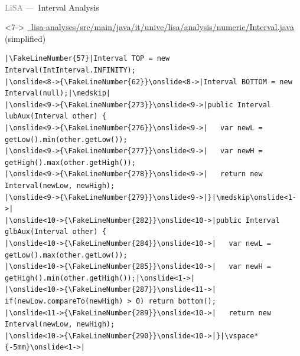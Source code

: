 \begin{frame}[fragile]{\textcolor{gray}{LiSA ---~}Interval Analysis\textsuperscript{\color{gray}\smaller[2]\cite[p.\,389]{cousout2021principles}}}
\begin{uncoverenv}<7->
{\scriptsize\color{gray}\href{https://github.com/lisa-analyzer/lisa/blob/bd00779ab87e1cd31ed01b97d9b0e71b922f5bcf/lisa/lisa-analyses/src/main/java/it/unive/lisa/analysis/numeric/Interval.java}{\hbox{\faFileCodeO~}lisa-analyses/src/main/java/it/unive/lisa/analysis/numeric/Interval.java} (simplified)}
\begin{verbatim}
|\FakeLineNumber{57}|Interval TOP = new Interval(IntInterval.INFINITY);
|\onslide<8->{\FakeLineNumber{62}}\onslide<8->|Interval BOTTOM = new Interval(null);|\medskip|
|\onslide<9->{\FakeLineNumber{273}}\onslide<9->|public Interval lubAux(Interval other) {
|\onslide<9->{\FakeLineNumber{276}}\onslide<9->|   var newL = getLow().min(other.getLow());
|\onslide<9->{\FakeLineNumber{277}}\onslide<9->|   var newH = getHigh().max(other.getHigh());
|\onslide<9->{\FakeLineNumber{278}}\onslide<9->|   return new Interval(newLow, newHigh);
|\onslide<9->{\FakeLineNumber{279}}\onslide<9->|}|\medskip\onslide<1->|
|\onslide<10->{\FakeLineNumber{282}}\onslide<10->|public Interval glbAux(Interval other) {
|\onslide<10->{\FakeLineNumber{284}}\onslide<10->|   var newL = getLow().max(other.getLow());
|\onslide<10->{\FakeLineNumber{285}}\onslide<10->|   var newH = getHigh().min(other.getHigh());|\onslide<1->|
|\onslide<10->{\FakeLineNumber{287}}\onslide<11->|   if(newLow.compareTo(newHigh) > 0) return bottom();
|\onslide<11->{\FakeLineNumber{289}}\onslide<10->|   return new Interval(newLow, newHigh);
|\onslide<10->{\FakeLineNumber{290}}\onslide<10->|}|\vspace*{-5mm}\onslide<1->|
\end{verbatim}
\endAnimateCode
{}
\end{uncoverenv}
\end{frame}
